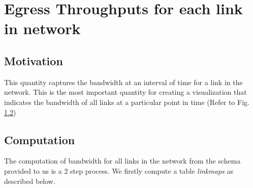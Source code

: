 \section{Egress Throughputs for each link in network}

\subsection{Motivation}
This quantity captures the bandwidth at an interval of time for a link in the network. This is the most important quantity for creating a visualization that indicates
the bandwidth of all links at a particular point in time (Refer to Fig. \ref{})

\subsection{Computation}
The computation of bandwidth for all links in the network from the schema provided to us is a 2 step process. We firstly compute a table \emph{linkmaps} as described
below.

